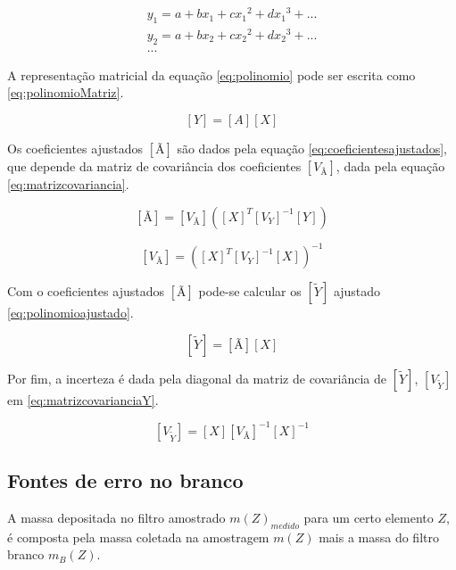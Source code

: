 \begin{equation}
  \label{eq:polinomio}
  \begin{split}
    y_1 = a + b x_1 + c{x_1}^2 + d{x_1}^3 + ...\\
    y_2 = a + b x_2 + c{x_2}^2 + d{x_2}^3 + ... \\
    ...
  \end{split}
\end{equation}

A representação matricial da equação \ref{eq:polinomio} pode 
ser escrita como \ref{eq:polinomioMatriz}.

\begin{equation}
  \label{eq:polinomioMatriz}
  [Y] = [A][X]
\end{equation}

Os coeficientes ajustados $[Ã]$ são dados pela equação \ref{eq:coeficientesajustados},
que depende da matriz de covariância dos coeficientes $[V_{Ã}]$, 
dada pela equação \ref{eq:matrizcovariancia}.

\begin{equation}
  \label{eq:coeficientesajustados}
  [Ã] = [V_{Ã}] ([X]^T {[V_Y]}^{-1} [Y])
\end{equation}

\begin{equation}
  \label{eq:matrizcovariancia}
  [V_{Ã}] = ([X]^T [V_Y]^{-1} [X])^{-1}
\end{equation}

Com o coeficientes ajustados $[Ã]$ pode-se calcular os 
$[\tilde{Y}]$ ajustado \ref{eq:polinomioajustado}.

\begin{equation}
  \label{eq:polinomioajustado}
  [\tilde{Y}] = [Ã][X]
\end{equation}

Por fim, a incerteza é dada pela diagonal da matriz de covariância 
de $[\tilde{Y}]$, $[V_{\tilde{Y}}]$ em \ref{eq:matrizcovarianciaY}.

\begin{equation}
  \label{eq:matrizcovarianciaY}
  [V_{\tilde{Y}}] = [X] [V_{Ã}]^{-1} [X]^{-1}
\end{equation}

\subsection{Fontes de erro no branco}

A massa depositada no filtro amostrado $m(Z)_{medido}$ para um certo 
elemento $Z$, é composta pela massa coletada na amostragem $m(Z)$ 
mais a massa do filtro branco $m_{B}(Z)$. 

